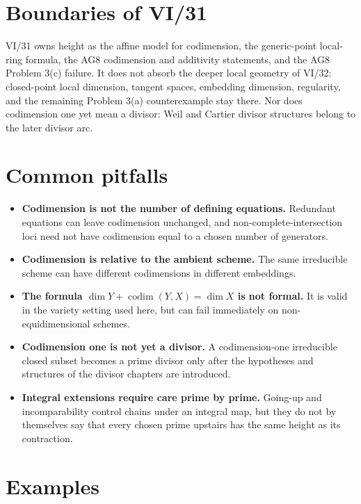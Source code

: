 \section{Boundaries of VI/31}\label{sec:vi31-boundaries}
VI/31 owns height as the affine model for codimension, the generic-point local-ring formula, the AG8 codimension and
additivity statements, and the AG8 Problem 3(c) failure.  It does not absorb the deeper local geometry of VI/32:
closed-point local dimension, tangent spaces, embedding dimension, regularity, and the remaining Problem 3(a)
counterexample stay there.  Nor does codimension one yet mean a divisor: Weil and Cartier divisor structures belong to
the later divisor arc.

\section{Common pitfalls}\label{sec:vi31-pitfalls}
\begin{itemize}
\item \textbf{Codimension is not the number of defining equations.}  Redundant equations can leave codimension unchanged,
and non-complete-intersection loci need not have codimension equal to a chosen number of generators.
\item \textbf{Codimension is relative to the ambient scheme.}  The same irreducible scheme can have different
codimensions in different embeddings.
\item \textbf{The formula $\dim Y+\operatorname{codim}(Y,X)=\dim X$ is not formal.}  It is valid in the variety setting used
here, but can fail immediately on non-equidimensional schemes.
\item \textbf{Codimension one is not yet a divisor.}  A codimension-one irreducible closed subset becomes a prime divisor
only after the hypotheses and structures of the divisor chapters are introduced.
\item \textbf{Integral extensions require care prime by prime.}  Going-up and incomparability control chains under an
integral map, but they do not by themselves say that every chosen prime upstairs has the same height as its contraction.
\end{itemize}

\section{Examples}



